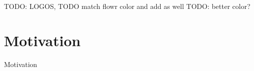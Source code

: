 


\titleframe

\begin{frame}
TODO: LOGOS, TODO match flowr color and add as well
TODO: better color?
\end{frame}

\section{Motivation}
\begin{frame}[c]{Motivation}
\end{frame}

